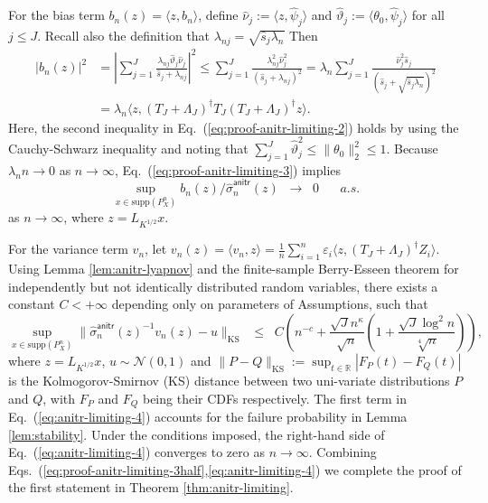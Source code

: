 \documentclass[aos]{imsart}
\newcommand{\ks}{\mathrm{KS}}
\renewcommand{\hat}{\widehat}
\newcommand{\supp}{\mathrm{supp}}
\newcommand{\anitr}{\mathsf{anitr}}
\theoremstyle{plain}
\theoremstyle{definition}
\theoremstyle{definition}
\begin{document}
\begin{appendix}
For the bias term $b_n(z)=\langle z,b_n\rangle$, define $\hat\nu_j := \langle z,\hat\psi_j\rangle$ and $\hat\vartheta_j := \langle \theta_0,\hat\psi_j\rangle$ for all $j\leq J$. 
Recall also the definition that $\lambda_{nj} = \sqrt{\hat s_j\lambda_n}$ Then
\begin{align}
\big|b_n(z)\big|^2 &= \left|\sum_{j=1}^J\frac{\lambda_{nj}\hat\vartheta_j\hat\nu_j}{\hat s_j+\lambda_{nj}}\right|^2 \leq \sum_{j=1}^J\frac{\lambda_{nj}^2\hat\nu_j^2}{(\hat s_j+\lambda_{nj})^2}
=\lambda_n\sum_{j=1}^J\frac{\hat\nu_j^2\hat s_j}{(\hat s_j+\sqrt{\hat s_j\lambda_n})^2}\label{eq:proof-anitr-limiting-2}\\
&= \lambda_n\langle z, (T_J+\Lambda_J)^\dagger T_J(T_J+\Lambda_J)^\dagger z\rangle.\label{eq:proof-anitr-limiting-3}
\end{align}
Here, the second inequality in Eq.~(\ref{eq:proof-anitr-limiting-2}) holds by using the Cauchy-Schwarz inequality and noting that $\sum_{j=1}^J\hat\vartheta_j^2\leq \|\theta_0\|_2^2\leq 1$.
Because $\lambda_n n\to0$ as $n\to\infty$, Eq.~(\ref{eq:proof-anitr-limiting-3}) implies
\begin{equation}
\sup_{x\in \supp(P_X^n)}b_n(z)/\hat\sigma_n^\anitr(z)\;\;\to\;\;0\;\;\;\;\;\;a.s.
\label{eq:proof-anitr-limiting-3half}
\end{equation}
as $n\to\infty$, where $z=L_{K^{1/2}}x$.

For the variance term $v_n$, let $v_n(z)= \langle v_n,z\rangle = \frac{1}{n}\sum_{i=1}^n\varepsilon_i \langle z, (T_J+\Lambda_J)^\dagger Z_i\rangle$.
Using Lemma \ref{lem:anitr-lyapnov} and the finite-sample Berry-Esseen theorem for independently but not identically distributed random variables, there exists a constant $C<+\infty$
depending only on parameters of Assumptions, such that
\begin{equation}
\sup_{x\in\supp(P_X^n)} \|\hat\sigma_n^\anitr(z)^{-1}v_n(z) - u\|_{\ks} \;\;\leq\;\; C\left(n^{-c} + \frac{\sqrt{J}n^{\kappa}}{\sqrt{n}} \left(1+\frac{\sqrt{J}\log^2 n}{\sqrt[4]{n}}\right)\right),
\label{eq:anitr-limiting-4}
\end{equation}
where $z=L_{K^{1/2}}x$, $u\sim\mathcal N(0,1)$ and $\|P-Q\|_\ks := \sup_{t\in\mathbb R}|F_P(t)-F_Q(t)|$ is the Kolmogorov-Smirnov (KS) distance between two uni-variate distributions $P$ and $Q$,
with $F_P$ and $F_Q$ being their CDFs respectively.
The first term in Eq.~(\ref{eq:anitr-limiting-4}) accounts for the failure probability in Lemma \ref{lem:stability}.
Under the conditions imposed, the right-hand side of Eq.~(\ref{eq:anitr-limiting-4}) converges to zero as $n\to\infty$.
Combining Eqs.~(\ref{eq:proof-anitr-limiting-3half},\ref{eq:anitr-limiting-4}) we complete the proof of the first statement in Theorem \ref{thm:anitr-limiting}.


\end{appendix}
\end{document}
